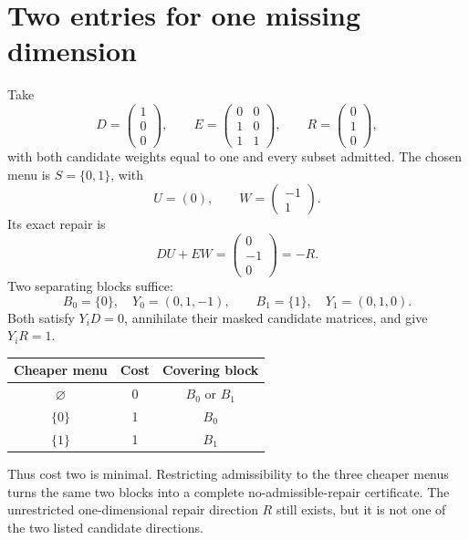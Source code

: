 \section{Two entries for one missing dimension}

Take
\[
 D=\begin{pmatrix}1\\0\\0\end{pmatrix},\qquad
 E=\begin{pmatrix}0&0\\1&0\\1&1\end{pmatrix},\qquad
 R=\begin{pmatrix}0\\1\\0\end{pmatrix},
\]
with both candidate weights equal to one and every subset admitted. The chosen menu is $S=\{0,1\}$, with
\[
 U=(0),\qquad W=\begin{pmatrix}-1\\1\end{pmatrix}.
\]
Its exact repair is
\[
 DU+EW=\begin{pmatrix}0\\-1\\0\end{pmatrix}=-R.
\]
Two separating blocks suffice:
\[
 B_0=\{0\},\quad Y_0=(0,1,-1),\qquad
 B_1=\{1\},\quad Y_1=(0,1,0).
\]
Both satisfy $Y_iD=0$, annihilate their masked candidate matrices, and give $Y_iR=1$.

\begin{center}
\begin{tabular}{@{}ccc@{}}\toprule
Cheaper menu & Cost & Covering block\\\midrule
$\varnothing$ & 0 & $B_0$ or $B_1$\\
$\{0\}$ & 1 & $B_0$\\
$\{1\}$ & 1 & $B_1$\\\bottomrule
\end{tabular}
\end{center}
Thus cost two is minimal. Restricting admissibility to the three cheaper menus turns the same two blocks into a complete no-admissible-repair certificate. The unrestricted one-dimensional repair direction $R$ still exists, but it is not one of the two listed candidate directions.


